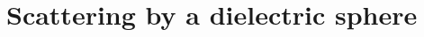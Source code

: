 \documentclass[11pt]{article}
\begin{document}
\clearpage 





\clearpage


\clearpage
\section{Scattering by a dielectric sphere}


\clearpage



\clearpage





\clearpage


\end{document}
